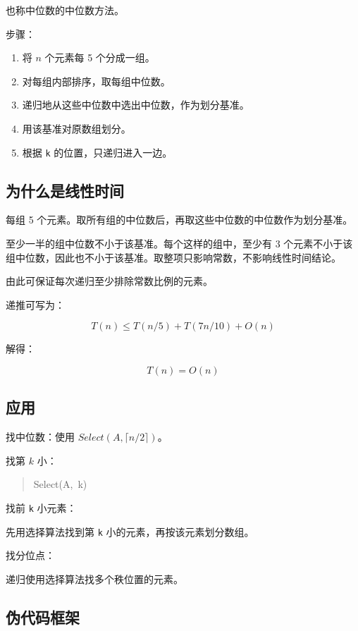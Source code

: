 \documentclass[UTF8,zihao=-4]{ctexart}
\begin{document}
也称中位数的中位数方法。

步骤：

\begin{enumerate}
\item 将 $n$ 个元素每 5 个分成一组。
\item 对每组内部排序，取每组中位数。
\item 递归地从这些中位数中选出中位数，作为划分基准。
\item 用该基准对原数组划分。
\item 根据 \texttt{k} 的位置，只递归进入一边。
\end{enumerate}

\subsection*{为什么是线性时间}

每组 5 个元素。取所有组的中位数后，再取这些中位数的中位数作为划分基准。

至少一半的组中位数不小于该基准。每个这样的组中，至少有 3 个元素不小于该组中位数，因此也不小于该基准。取整项只影响常数，不影响线性时间结论。

由此可保证每次递归至少排除常数比例的元素。

递推可写为：

\[T(n) \le  T(n/5) + T(7n/10) + O(n)\]

解得：

\[T(n) = O(n)\]

\subsection*{应用}

找中位数：使用 $Select(A, \lceil n/2 \rceil)$。

找第 $k$ 小：

\begin{quote}
\small\ttfamily\raggedright
\relax Select(A,\ k)\\
\end{quote}

找前 \texttt{k} 小元素：

先用选择算法找到第 \texttt{k} 小的元素，再按该元素划分数组。

找分位点：

递归使用选择算法找多个秩位置的元素。

\subsection*{伪代码框架}
\end{document}
